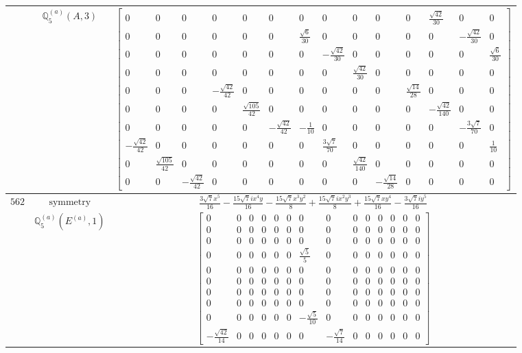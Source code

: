 \documentclass[fleqn,8pt,landscape]{jsarticle}
\begin{document}
\begin{longtable}{ccc}
$  $ & $ \mathbb{Q}_{5}^{(a)}(A,3) $ & $ \begin{bmatrix} 0 & 0 & 0 & 0 & 0 & 0 & 0 & 0 & 0 & 0 & 0 & \frac{\sqrt{42}}{30} & 0 & 0 \\ 0 & 0 & 0 & 0 & 0 & 0 & \frac{\sqrt{6}}{30} & 0 & 0 & 0 & 0 & 0 & - \frac{\sqrt{42}}{30} & 0 \\ 0 & 0 & 0 & 0 & 0 & 0 & 0 & - \frac{\sqrt{42}}{30} & 0 & 0 & 0 & 0 & 0 & \frac{\sqrt{6}}{30} \\ 0 & 0 & 0 & 0 & 0 & 0 & 0 & 0 & \frac{\sqrt{42}}{30} & 0 & 0 & 0 & 0 & 0 \\ 0 & 0 & 0 & - \frac{\sqrt{42}}{42} & 0 & 0 & 0 & 0 & 0 & 0 & \frac{\sqrt{14}}{28} & 0 & 0 & 0 \\ 0 & 0 & 0 & 0 & \frac{\sqrt{105}}{42} & 0 & 0 & 0 & 0 & 0 & 0 & - \frac{\sqrt{42}}{140} & 0 & 0 \\ 0 & 0 & 0 & 0 & 0 & - \frac{\sqrt{42}}{42} & - \frac{1}{10} & 0 & 0 & 0 & 0 & 0 & - \frac{3 \sqrt{7}}{70} & 0 \\ - \frac{\sqrt{42}}{42} & 0 & 0 & 0 & 0 & 0 & 0 & \frac{3 \sqrt{7}}{70} & 0 & 0 & 0 & 0 & 0 & \frac{1}{10} \\ 0 & \frac{\sqrt{105}}{42} & 0 & 0 & 0 & 0 & 0 & 0 & \frac{\sqrt{42}}{140} & 0 & 0 & 0 & 0 & 0 \\ 0 & 0 & - \frac{\sqrt{42}}{42} & 0 & 0 & 0 & 0 & 0 & 0 & - \frac{\sqrt{14}}{28} & 0 & 0 & 0 & 0 \end{bmatrix} $ \\ \hline
$ 562 $ & $ \text{symmetry} $ & $ \frac{3 \sqrt{7} x^{5}}{16} - \frac{15 \sqrt{7} i x^{4} y}{16} - \frac{15 \sqrt{7} x^{3} y^{2}}{8} + \frac{15 \sqrt{7} i x^{2} y^{3}}{8} + \frac{15 \sqrt{7} x y^{4}}{16} - \frac{3 \sqrt{7} i y^{5}}{16} $ \\
$  $ & $ \mathbb{Q}_{5}^{(a)}(E^{(a)},1) $ & $ \begin{bmatrix} 0 & 0 & 0 & 0 & 0 & 0 & 0 & 0 & 0 & 0 & 0 & 0 & 0 & 0 \\ 0 & 0 & 0 & 0 & 0 & 0 & 0 & 0 & 0 & 0 & 0 & 0 & 0 & 0 \\ 0 & 0 & 0 & 0 & 0 & 0 & 0 & 0 & 0 & 0 & 0 & 0 & 0 & 0 \\ 0 & 0 & 0 & 0 & 0 & 0 & \frac{\sqrt{5}}{5} & 0 & 0 & 0 & 0 & 0 & 0 & 0 \\ 0 & 0 & 0 & 0 & 0 & 0 & 0 & 0 & 0 & 0 & 0 & 0 & 0 & 0 \\ 0 & 0 & 0 & 0 & 0 & 0 & 0 & 0 & 0 & 0 & 0 & 0 & 0 & 0 \\ 0 & 0 & 0 & 0 & 0 & 0 & 0 & 0 & 0 & 0 & 0 & 0 & 0 & 0 \\ 0 & 0 & 0 & 0 & 0 & 0 & 0 & 0 & 0 & 0 & 0 & 0 & 0 & 0 \\ 0 & 0 & 0 & 0 & 0 & 0 & - \frac{\sqrt{5}}{10} & 0 & 0 & 0 & 0 & 0 & 0 & 0 \\ - \frac{\sqrt{42}}{14} & 0 & 0 & 0 & 0 & 0 & 0 & - \frac{\sqrt{7}}{14} & 0 & 0 & 0 & 0 & 0 & 0 \end{bmatrix} $ \\ \hline

\end{longtable}
\end{document}

